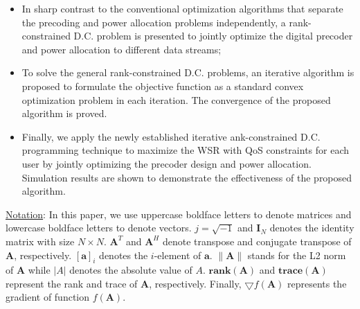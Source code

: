 \documentclass[10pt,journal,twocolumn,twoside]{IEEEtran}
\begin{document}
\begin{itemize}[leftmargin=*]
		
\item In sharp contrast to the conventional optimization algorithms that separate the precoding and power allocation problems independently, a rank-constrained D.C. problem is presented to jointly optimize the digital precoder and power allocation to different data streams;

\item To solve the general rank-constrained D.C. problems, an iterative algorithm is proposed to formulate the objective function as a standard convex optimization problem in each iteration. The convergence of the proposed algorithm is proved.

\item Finally, we apply the newly established iterative ank-constrained D.C. programming technique to maximize the WSR with QoS constraints for each user by jointly optimizing the precoder design and power allocation. Simulation results are shown to demonstrate the effectiveness of the proposed algorithm.

\end{itemize}


{\underline{Notation}: In this paper, we use uppercase boldface letters to denote matrices and lowercase boldface letters to denote vectors. $j = \sqrt{-1}$ and $\bm{I}_N$ denotes the identity matrix with size $N\times N$. ${\bm A}^T$ and ${\bm A}^H$ denote transpose and conjugate transpose of ${\bm A}$, respectively. $[\bm{a}]_{i}$ denotes the $i$-element of ${\bm a}$. $\|\bm{A}\| $ stands for the L2 norm of ${\bm A}$ while $|A|$ denotes the absolute value of $A$.  $\textbf{rank}(\bm{A})$ and $\textbf{trace}(\bm{A})$ represent the rank and trace of $\bm{A}$, respectively. Finally, $\bigtriangledown f(\bm{A})$ represents the gradient of function $f(\bm{A})$.}


\end{document}
